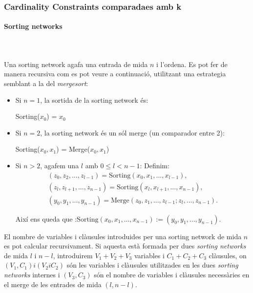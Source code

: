 \documentclass[11pt,a4paper,twoside]{report}
\begin{document}
  \subsubsection{Cardinality Constraints comparadaes amb k}
  \paragraph*{Sorting networks}~\\~\\
  Una sorting network agafa una entrada de mida $n$ i l'ordena. Es pot fer de manera recursiva com es pot veure a continuació, utilitzant una estrategia semblant a la del \textit{mergesort}:
  
  \begin{itemize}
    \item Si $n = 1$, la sortida de la sorting network és:\\ \begin{center} Sorting($x_0$) = $x_0$\end{center}
    \item Si $n = 2$, la sorting network és un sól merge (un comparador entre 2):\\ \begin{center} Sorting($x_0, x_1$) = Merge($x_0, x_1$)\end{center}
    \item Si $n > 2$, agafem una $l$ amb $0 \leq l < n-1$: Definim:
    \begin{gather*}
      (z_0,z_2, . . . ,z_{l-1}) = \text{Sorting}(x_0, x_1, . . . , x_{l-1}),\\
      (z_l,z_{l+1}, . . . ,z_{n-1}) = \text{Sorting}(x_l, x_{l+1}, . . . , x_{n-1}), \\
      (y_0, y_1, . . . , y_{n-1}) = \text{Merge}(z_0,z_1, . . . , z_{l-1};z_l, . . . ,z_{n-1}).
    \end{gather*}

    Així ens queda que :$\text{Sorting}(x_0, x_1, . . . , x_{n-1}) := (y_0, y_1, . . . , y_{n-1}).$
  \end{itemize}

  El nombre de variables i clàusules introduides per una sorting network de mida $n$ es pot calcular recursivament. Si aquesta està formada per dues \textit{sorting networks} de mida $l$ i $n-l$, introduirem $V_1 + V_2 + V_3$ variables i $C_1 + C_2 + C_3$ clàusules, on $(V_1, C_1) i (V_2 i C_2)$ són les variables i clàusules utilitzades en les dues \textit{sorting networks} internes i $(V_3, C_3)$ són el nombre de variables i clàusules necessàries en el merge de les entrades de mida $(l, n-l)$.
\end{document}
